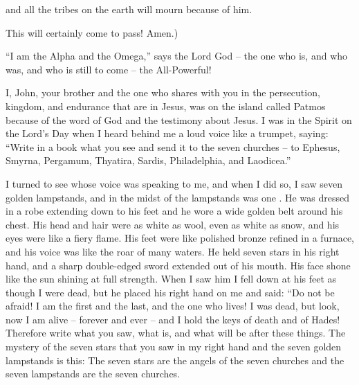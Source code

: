 {\par }{\Q and
all
the tribes
on the earth
will mourn
because of
him.
\par }{\Q This will certainly come to pass!
Amen.)
\par }{\PP {}“I
am
the Alpha
and
the Omega,”
says
the Lord
God –
the one who is,
and
who was,
and
who is still to come –
the All-Powerful!
\par }{\PP {}I,
John,
your
brother
and
the one who shares
with you in
the persecution,
kingdom,
and
endurance
that are in
Jesus,
was
on
the island
called
Patmos
because of
the word
of God
and
the testimony
about Jesus.
I was
in
the Spirit
on
the Lord’s
Day
when
I heard
behind
me
a loud
voice
like
a trumpet,
saying: “Write
in
a book
what
you see
and
send
it to the seven
churches
– to
Ephesus,
Smyrna,
Pergamum,
Thyatira,
Sardis,
Philadelphia,
and
Laodicea.”
\par }{\PP {}I turned
to see
whose voice
was
speaking
to
me,
and
when
I did
so, I saw
seven
golden
lampstands,
and
in
the midst
of the lampstands
was one
{}.
He was dressed in
a robe extending down to
his feet
and
he wore a wide
golden
belt
around
his chest.
His
head
and
hair
were as white
as
wool,
even as white
as
snow,
and
his
eyes
were like
a fiery
flame.
His
feet
were like
polished bronze
refined
in
a furnace,
and
his
voice
was like
the roar
of many
waters.
He held
seven
stars
in
his
right
hand,
and
a sharp
double-edged
sword
extended out
of
his
mouth.
His
face shone
like
the sun
shining
at
full strength.
When
I saw
him
I fell down
at
his
feet
as though
I were dead,
but
he placed
his
right hand
on
me
and said: “Do
not
be afraid! I
am
the first
and
the last,
and
the one who lives! I was
dead,
but
look,
now I am
alive
– forever
and ever
– and
I hold
the keys
of death
and
of Hades!
Therefore
write
what
you saw,
what
is,
and
what
will
be
after
these things.
The
mystery
of the seven
stars
that
you saw
in
my
right hand
and
the seven
golden
lampstands
is this: The seven
stars
are
the angels
of the
seven
churches
and
the seven
lampstands
are
the seven
churches.

}

